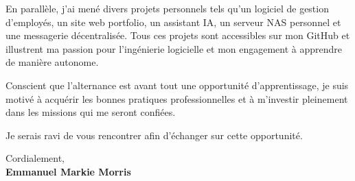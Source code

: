 \documentclass[11pt]{letter}
\begin{document}
En parallèle, j’ai mené divers projets personnels tels qu’un logiciel de gestion d’employés, un site web portfolio, un assistant IA, un serveur NAS personnel et une messagerie décentralisée. Tous ces projets sont accessibles sur mon GitHub et illustrent ma passion pour l'ingénierie logicielle et mon engagement à apprendre de manière autonome.

Conscient que l’alternance est avant tout une opportunité d’apprentissage, je suis motivé à acquérir les bonnes pratiques professionnelles et à m’investir pleinement dans les missions qui me seront confiées.

Je serais ravi de vous rencontrer afin d’échanger sur cette opportunité.

\closing{Cordialement,\\[1em]\textbf{Emmanuel Markie Morris}}
\end{document}
